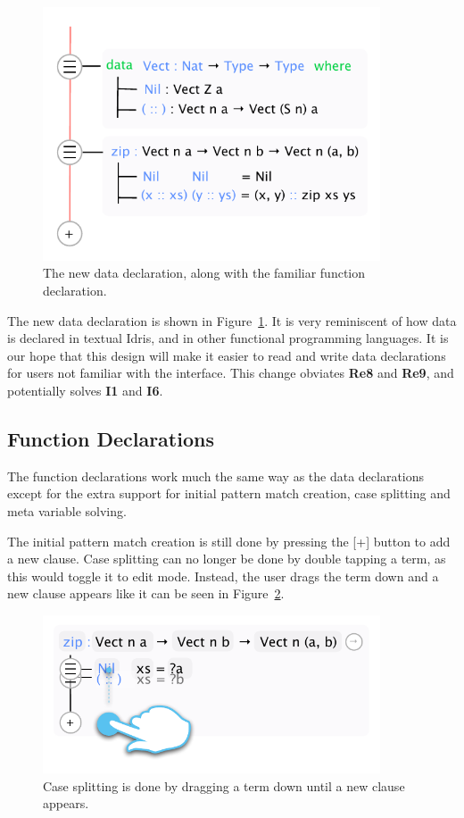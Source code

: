 \begin{figure}
	\centering
		\includegraphics[width=100mm]{diagrams/final_design_nothing_in_focus.pdf}
	\caption{The new data declaration, along with the familiar function declaration.}
\label{fig:new_data_declaration}
\end{figure}

The new data declaration is shown in Figure~\ref{fig:new_data_declaration}.
It is very reminiscent of how data is declared in textual Idris, and in other functional programming languages.
It is our hope that this design will make it easier to read and write data declarations for users not familiar with the interface. This change obviates \textbf{Re8} and \textbf{Re9}, and potentially solves \textbf{I1} and \textbf{I6}.

\subsection{Function Declarations}
\label{subsec:new_design_function_dec}
The function declarations work much the same way as the data declarations
except for the extra support for initial pattern match creation, case splitting
and meta variable solving.

The initial pattern match creation is still done by pressing the [+] button to
add a new clause. Case splitting can no longer be done by double tapping a
term, as this would toggle it to edit mode. Instead, the user drags the term
down and a new clause appears like it can be seen in Figure~\ref{fig:case_splitting}.

\begin{figure}
	\centering
		\includegraphics[width=100mm]{diagrams/design_case_splitting.pdf}
	\caption{Case splitting is done by dragging a term down until a new clause
	appears.}
\label{fig:case_splitting}
\end{figure}

